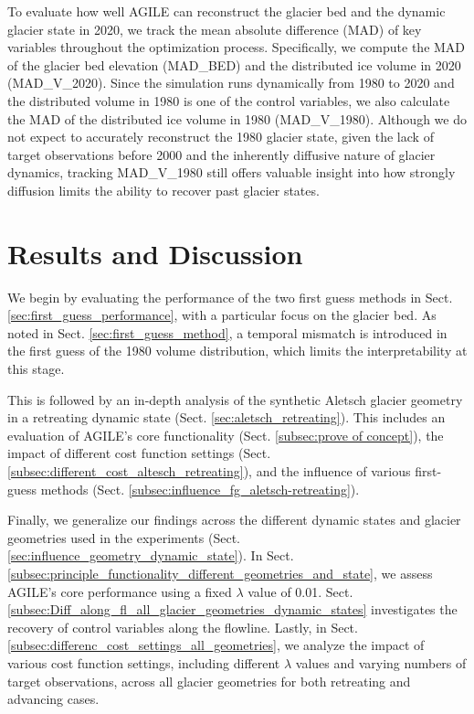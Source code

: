 \documentclass[journal abbreviation, manuscript]{copernicus}
\begin{document}
To evaluate how well AGILE can reconstruct the glacier bed and the dynamic glacier state in 2020, we track the mean absolute difference (MAD) of key variables throughout the optimization process. Specifically, we compute the MAD of the glacier bed elevation (MAD\_BED) and the distributed ice volume in 2020 (MAD\_V\_2020). Since the simulation runs dynamically from 1980 to 2020 and the distributed volume in 1980 is one of the control variables, we also calculate the MAD of the distributed ice volume in 1980 (MAD\_V\_1980). Although we do not expect to accurately reconstruct the 1980 glacier state, given the lack of target observations before 2000 and the inherently diffusive nature of glacier dynamics, tracking MAD\_V\_1980 still offers valuable insight into how strongly diffusion limits the ability to recover past glacier states.


\section{Results and Discussion}
\label{sec:results}

We begin by evaluating the performance of the two first guess methods in Sect. \ref{sec:first_guess_performance}, with a particular focus on the glacier bed. As noted in Sect. \ref{sec:first_guess_method}, a temporal mismatch is introduced in the first guess of the 1980 volume distribution, which limits the interpretability at this stage.

This is followed by an in-depth analysis of the synthetic Aletsch glacier geometry in a retreating dynamic state (Sect. \ref{sec:aletsch_retreating}). This includes an evaluation of AGILE’s core functionality (Sect. \ref{subsec:prove of concept}), the impact of different cost function settings (Sect. \ref{subsec:different_cost_altesch_retreating}), and the influence of various first-guess methods (Sect. \ref{subsec:influence_fg_aletsch-retreating}).

Finally, we generalize our findings across the different dynamic states and glacier geometries used in the experiments (Sect. \ref{sec:influence_geometry_dynamic_state}). In Sect. \ref{subsec:principle_functionality_different_geometries_and_state}, we assess AGILE’s core performance using a fixed $\lambda$ value of 0.01. Sect. \ref{subsec:Diff_along_fl_all_glacier_geometries_dynamic_states} investigates the recovery of control variables along the flowline. Lastly, in Sect. \ref{subsec:differenc_cost_settings_all_geometries}, we analyze the impact of various cost function settings, including different $\lambda$ values and varying numbers of target observations, across all glacier geometries for both retreating and advancing cases.
\end{document}
